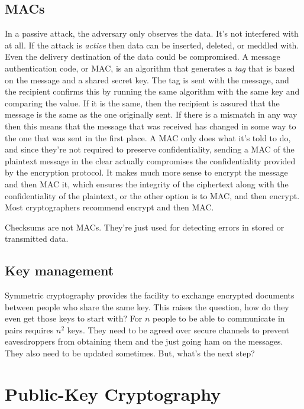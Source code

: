 \documentclass[11pt,a4paper,titlepage]{scrartcl}
\begin{document}
\subsection{MACs}%
\label{sub:MACs}
In a passive attack, the adversary only observes the data. It's not
interfered with at all. If the attack is \textit{active} then data can be
inserted, deleted, or meddled with. Even the delivery destination of the
data could be compromised. A message authentication code, or MAC, is an
algorithm that generates a \textit{tag} that is based on the message and a
shared secret key. The tag is sent with the message, and the recipient
confirms this by running the same algorithm with the same key and
comparing the value. If it is the same, then the recipient is assured that
the message is the same as the one originally sent. If there is a mismatch
in any way then this means that the message that was received has changed
in some way to the one that was sent in the first place. A MAC only does
what it's told to do, and since they're not required to preserve
confidentiality, sending a MAC of the plaintext message in the clear
actually compromises the confidentiality provided by the encryption
protocol. It makes much more sense to encrypt the message and then MAC it,
which ensures the integrity of the ciphertext along with the
confidentiality of the plaintext, or the other option is to MAC, and then
encrypt. Most cryptographers recommend encrypt and then MAC.

Checksums are not MACs. They're just used for detecting errors in stored
or transmitted data.

\subsection{Key management}%
\label{sub:Key management}

Symmetric cryptography provides the facility to exchange encrypted
documents between people who share the same key. This raises the question,
how do they even get those keys to start with? For $n$ people to be able
to communicate in pairs requires $n^2$ keys. They need to be agreed over
secure channels to prevent eavesdroppers from obtaining them and the just
going ham on the messages. They also need to be updated sometimes. But,
what's the next step?

\section{Public-Key Cryptography}%
\label{sec:Public}
\end{document}
